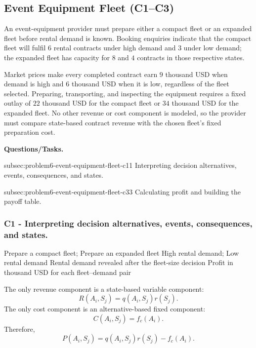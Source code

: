 
	\subsection{Event Equipment Fleet (C1--C3)}
	\label{sec:problem6-event-equipment-fleet-c1-c3}

	An event-equipment provider must prepare either a compact fleet or an expanded fleet before rental demand is known. Booking enquiries indicate that the compact fleet will fulfil \(6\) rental contracts under high demand and \(3\) under low demand; the expanded fleet has capacity for \(8\) and \(4\) contracts in those respective states.

	Market prices make every completed contract earn \(9\) thousand USD when demand is high and \(6\) thousand USD when it is low, regardless of the fleet selected. Preparing, transporting, and inspecting the equipment requires a fixed outlay of \(22\) thousand USD for the compact fleet or \(34\) thousand USD for the expanded fleet. No other revenue or cost component is modeled, so the provider must compare state-based contract revenue with the chosen fleet's fixed preparation cost.

	\textbf{Questions/Tasks.}
	\begin{enumerate}
		\CriterionTask
		{subsec:problem6-event-equipment-fleet-c1}{1}
		{Interpreting decision alternatives, events, consequences, and states.}

		\CriterionTask
		{subsec:problem6-event-equipment-fleet-c3}{3}
		{Calculating profit and building the payoff table.}
	\end{enumerate}

	\subsubsection*{C1 - Interpreting decision alternatives, events, consequences, and states.}
	\label{subsec:problem6-event-equipment-fleet-c1}

	\DecisionElementsTable
	{Prepare a compact fleet; Prepare an expanded fleet}
	{High rental demand; Low rental demand}
	{Rental demand revealed after the fleet-size decision}
	{Profit in thousand USD for each fleet--demand pair}

	The only revenue component is a state-based variable component:
	\[
	R(A_i,S_j)=q(A_i,S_j)r(S_j).
	\]
	The only cost component is an alternative-based fixed component:
	\[
	C(A_i,S_j)=f_c(A_i).
	\]
	Therefore,
	\[
	P(A_i,S_j)
	=
	q(A_i,S_j)r(S_j)
	-
	f_c(A_i).
	\]

